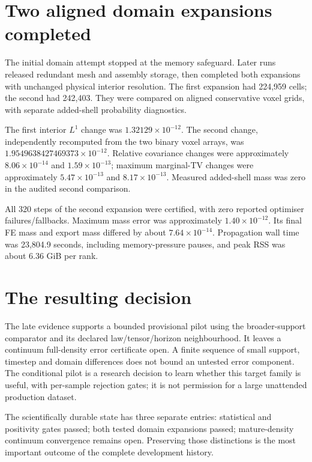 \section{Two aligned domain expansions completed}
The initial domain attempt stopped at the memory safeguard. Later runs released redundant mesh and assembly storage, then completed both expansions with unchanged physical interior resolution. The first expansion had 224,959 cells; the second had 242,403. They were compared on aligned conservative voxel grids, with separate added-shell probability diagnostics.

The first interior $L^1$ change was $1.32129\times10^{-12}$. The second change, independently recomputed from the two binary voxel arrays, was $1.9549638427469373\times10^{-12}$. Relative covariance changes were approximately $8.06\times10^{-14}$ and $1.59\times10^{-13}$; maximum marginal-TV changes were approximately $5.47\times10^{-13}$ and $8.17\times10^{-13}$. Measured added-shell mass was zero in the audited second comparison.

All 320 steps of the second expansion were certified, with zero reported optimiser failures/fallbacks. Maximum mass error was approximately $1.40\times10^{-12}$. Its final FE mass and export mass differed by about $7.64\times10^{-14}$. Propagation wall time was 23,804.9 seconds, including memory-pressure pauses, and peak RSS was about 6.36 GiB per rank.


\section{The resulting decision}
The late evidence supports a bounded provisional pilot using the broader-support comparator and its declared law/tensor/horizon neighbourhood. It leaves a continuum full-density error certificate open. A finite sequence of small support, timestep and domain differences does not bound an untested error component. The conditional pilot is a research decision to learn whether this target family is useful, with per-sample rejection gates; it is not permission for a large unattended production dataset.

The scientifically durable state has three separate entries: statistical and positivity gates passed; both tested domain expansions passed; mature-density continuum convergence remains open. Preserving those distinctions is the most important outcome of the complete development history.
